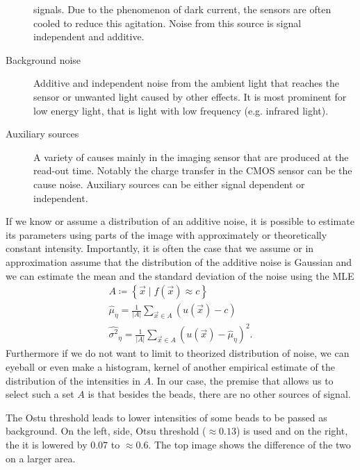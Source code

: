 \begin{description}
            signals.
            Due to the phenomenon of dark current, the sensors are often cooled to reduce this agitation.
            Noise from this source is signal independent and additive.
    \item[Background noise]
        Additive and independent noise from the ambient light that reaches the sensor or unwanted light caused by other
        effects.
        It is most prominent for low energy light, that is light with low frequency (e.g. infrared light).
    \item[Auxiliary sources]
        A variety of causes mainly in the imaging sensor that are produced at the read-out time.
        Notably the charge transfer in the \ac{CMOS} sensor can be the cause noise.
        Auxiliary sources can be either signal dependent or independent.
\end{description}

If we know or assume a distribution of an additive noise, it is possible to estimate its parameters using parts of the
    image with approximately or theoretically constant intensity.
Importantly, it is often the case that we assume or in approximation assume that the distribution of the additive noise 
    is Gaussian and we can estimate the mean and the standard deviation of the noise using the \ac{MLE}
\begin{gather*}
    A \coloneq \left\{ \vec{x} \mid f(\vec{x}) \approx c  \right\} \\
    \hat{\mu}_{\eta} = \frac{1}{|A|} \sum_{\vec{x} \in A} (u(\vec{x}) - c) \\
    \hat{\sigma^2}_{\eta} = \frac{1}{|A|} \sum_{\vec{x} \in  A} (u(\vec{x}) - \hat{\mu}_{\eta})^2.
\end{gather*}
Furthermore if we do not want to limit to theorized distribution of noise, we can eyeball or even make a histogram,
    kernel of another empirical estimate of the distribution of the intensities in \(A\).
In our case, the premise that allows us to select such a set \(A\) is that besides the beads, there are no other sources
    of signal.

\begin{marginfigure}
    \caption{The Ostu threshold leads to lower intensities of some beads to be passed as background. On the left, side,
        Otsu threshold (\(\approx 0.13\)) is used and on the right, the it is lowered by \(0.07\) to \(\approx 0.6\). The top
        image shows the difference of the two on a larger area.}
\end{marginfigure}

